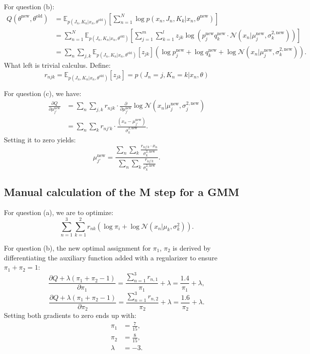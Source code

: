 \documentclass[UTF8]{ctexart}
\begin{document}
For question (b):
$$
\begin{aligned}
Q(\theta^{\text{new}},\theta^{\text{old}})&=\mathbb{E}_{p(J_{n},K_{n}|x_{n},\theta^{\text{old}})}\left[\sum_{n=1}^{N}\log p(x_{n},J_{n},K_{k}|x_{n},\theta^{\text{new}}) \right]\\
&=\sum_{n=1}^{N}\mathbb{E}_{p(J_{n},K_{n}|x_{n},\theta^{\text{old}})}\left[\sum_{j=1}^{m}\sum_{k=1}^{l}z_{jk}\log\left(p_{j}^{\text{new}}q_{k}^{\text{new}}\cdot\mathcal{N}(x_{n}|\mu_{j}^{\text{new}},\sigma^{2,\text{new}}_{k})\right) \right]\\
&=\sum_{n}\sum_{j,k}\mathbb{E}_{p(J_{n},K_{n}|x_{n},\theta^{\text{old}})}\left[z_{jk} \right]\left(\log p_{j}^{\text{new}}+\log q_{k}^{\text{new}}+\log \mathcal{N}(x_{n}|\mu_{j}^{\text{new}},\sigma^{2,\text{new}}_{k}) \right).
\end{aligned}
$$
What left is trivial calculus.
Define:
$$r_{njk}=\mathbb{E}_{p(J_{n},K_{n}|x_{n},\theta^{\text{old}})}\left[z_{jk} \right]=p(J_{n}=j,K_{n}=k|x_{n},\theta)$$

For question (c), we have:
$$
\begin{aligned}
\frac{\partial Q}{\partial \mu_{j'}^{\text{new}}}&=\sum_{n}\sum_{j,k}r_{njk}\cdot\frac{\partial}{\partial \mu_{j'}^{\text{new}}}\log\mathcal{N}(x_{n}|\mu_{j}^{\text{new}},\sigma_{j}^{2,\text{new}})\\
&=\sum_{n}\sum_{k}r_{nj'k}\cdot\frac{(x_{n}-\mu_{j'}^{\text{new}})}{\sigma_{k}^{2,\text{new}}}.
\end{aligned}
$$
Setting it to zero yields:
$$\mu_{j'}^{\text{new}}=\frac{\sum_{n}\sum_{k}\frac{r_{nj'k}\cdot x_{n}}{\sigma_{k}^{2,\text{new}}}}{\sum_{n}\sum_{k}\frac{r_{nj'k}}{\sigma_{k}^{2,\text{new}}}}.$$


\subsection{Manual calculation of the M step for a GMM}
For question (a), we are to optimize:
$$\sum_{n=1}^{3}\sum_{k=1}^{2}r_{nk}\left(\log \pi_{i}+\log \mathcal{N}(x_{n}|\mu_{k},\sigma^{2}_{k}) \right).$$

For question (b), the new optimal assignment for $\pi_{1}$, $\pi_{2}$ is derived by differentiating the auxiliary function added with a regularizer to ensure $\pi_{1}+\pi_{2}=1$:
$$\frac{\partial Q+\lambda(\pi_{1}+\pi_{2}-1)}{\partial \pi_{1}}=\frac{\sum_{n=1}^{3}r_{n,1}}{\pi_{1}}+\lambda=\frac{1.4}{\pi_{1}}+\lambda,$$
$$\frac{\partial Q+\lambda(\pi_{1}+\pi_{2}-1)}{\partial \pi_{2}}=\frac{\sum_{n=1}^{3}r_{n,2}}{\pi_{2}}+\lambda=\frac{1.6}{\pi_{2}}+\lambda.$$
Setting both gradients to zero ends up with:
$$
\begin{aligned}
\pi_{1}&=\frac{7}{15},\\
\pi_{2}&=\frac{8}{15},\\
\lambda&=-3.
\end{aligned}
$$
\end{document}
